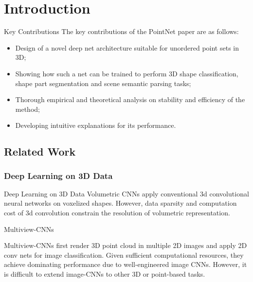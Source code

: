 \section{Introduction}


\begin{frame}[c]{Key Contributions}
The key contributions of the PointNet paper are as follows:
    \begin{itemize}
        \item Design of a novel deep net architecture suitable for unordered point sets in 3D;
        \item Showing how such a net can be trained to perform 3D shape classification, shape part segmentation and scene semantic parsing tasks;
        \item Thorough empirical and theoretical analysis on stability and efficiency of the method;
        \item Developing intuitive explanations for its performance.
    \end{itemize}
\end{frame}

\subsection{Related Work}
\subsubsection{Deep Learning on 3D Data}

\begin{frame}[c]{Deep Learning on 3D Data}
    Volumetric CNNs \cite{wu20153d, maturana2015voxnet, qi2016volumetric} apply
conventional 3d convolutional neural networks on voxelized shapes. However,
data sparsity and computation cost of 3d convolution constrain the resolution
of volumetric representation.
\end{frame}



\begin{frame}[c]{Multiview-CNNs}

Multiview-CNNs \cite{su2015multi, qi2016volumetric} first render 3D point cloud
in multiple 2D images and apply 2D conv nets for image classification. Given
sufficient computational resources, they achieve dominating performance due to
well-engineered image CNNs. However, it is difficult to extend
image-CNNs to other 3D or point-based tasks.

\end{frame}


